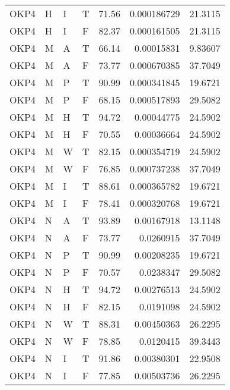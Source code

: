 \begin{longtable}{llllrrr}
    OKP4     & H     & I     & T          & 71.56      & 0.000186729 & 21.3115  \\
    OKP4     & H     & I     & F          & 82.37      & 0.000161505 & 21.3115  \\
    OKP4     & M     & A     & T          & 66.14      & 0.00015831  & 9.83607  \\
    OKP4     & M     & A     & F          & 73.77      & 0.000670385 & 37.7049  \\
    OKP4     & M     & P     & T          & 90.99      & 0.000341845 & 19.6721  \\
    OKP4     & M     & P     & F          & 68.15      & 0.000517893 & 29.5082  \\
    OKP4     & M     & H     & T          & 94.72      & 0.00044775  & 24.5902  \\
    OKP4     & M     & H     & F          & 70.55      & 0.00036664  & 24.5902  \\
    OKP4     & M     & W     & T          & 82.15      & 0.000354719 & 24.5902  \\
    OKP4     & M     & W     & F          & 76.85      & 0.000737238 & 37.7049  \\
    OKP4     & M     & I     & T          & 88.61      & 0.000365782 & 19.6721  \\
    OKP4     & M     & I     & F          & 78.41      & 0.000320768 & 19.6721  \\
    OKP4     & N     & A     & T          & 93.89      & 0.00167918  & 13.1148  \\
    OKP4     & N     & A     & F          & 73.77      & 0.0260915   & 37.7049  \\
    OKP4     & N     & P     & T          & 90.99      & 0.00208235  & 19.6721  \\
    OKP4     & N     & P     & F          & 70.57      & 0.0238347   & 29.5082  \\
    OKP4     & N     & H     & T          & 94.72      & 0.00276513  & 24.5902  \\
    OKP4     & N     & H     & F          & 82.15      & 0.0191098   & 24.5902  \\
    OKP4     & N     & W     & T          & 88.31      & 0.00450363  & 26.2295  \\
    OKP4     & N     & W     & F          & 78.85      & 0.0120415   & 39.3443  \\
    OKP4     & N     & I     & T          & 91.86      & 0.00380301  & 22.9508  \\
    OKP4     & N     & I     & F          & 77.85      & 0.00503736  & 26.2295  \\

\end{longtable}
